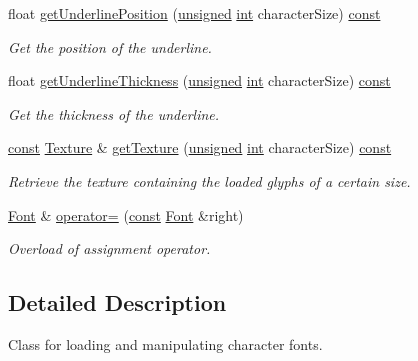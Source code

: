 \begin{DoxyCompactItemize}
float \hyperlink{classsf_1_1_font_a9b21290b1b8bbf75232f64bdd7a994da}{get\-Underline\-Position} (\hyperlink{curses_8priv_8h_aca40206900cfc164654362fa8d4ad1e6}{unsigned} \hyperlink{term__entry_8h_ad65b480f8c8270356b45a9890f6499ae}{int} character\-Size) \hyperlink{term__entry_8h_a57bd63ce7f9a353488880e3de6692d5a}{const} 
\begin{DoxyCompactList}\small\item\em Get the position of the underline. \end{DoxyCompactList}\item 
float \hyperlink{classsf_1_1_font_a17fd6090e585a76f1f7b7f658ea70ee1}{get\-Underline\-Thickness} (\hyperlink{curses_8priv_8h_aca40206900cfc164654362fa8d4ad1e6}{unsigned} \hyperlink{term__entry_8h_ad65b480f8c8270356b45a9890f6499ae}{int} character\-Size) \hyperlink{term__entry_8h_a57bd63ce7f9a353488880e3de6692d5a}{const} 
\begin{DoxyCompactList}\small\item\em Get the thickness of the underline. \end{DoxyCompactList}\item 
\hyperlink{term__entry_8h_a57bd63ce7f9a353488880e3de6692d5a}{const} \hyperlink{classsf_1_1_texture}{Texture} \& \hyperlink{classsf_1_1_font_a887368a4e6a3dfa32dea89d2af315951}{get\-Texture} (\hyperlink{curses_8priv_8h_aca40206900cfc164654362fa8d4ad1e6}{unsigned} \hyperlink{term__entry_8h_ad65b480f8c8270356b45a9890f6499ae}{int} character\-Size) \hyperlink{term__entry_8h_a57bd63ce7f9a353488880e3de6692d5a}{const} 
\begin{DoxyCompactList}\small\item\em Retrieve the texture containing the loaded glyphs of a certain size. \end{DoxyCompactList}\item 
\hyperlink{classsf_1_1_font}{Font} \& \hyperlink{classsf_1_1_font_a232515549846e3172a514d0b47918399}{operator=} (\hyperlink{term__entry_8h_a57bd63ce7f9a353488880e3de6692d5a}{const} \hyperlink{classsf_1_1_font}{Font} \&right)
\begin{DoxyCompactList}\small\item\em Overload of assignment operator. \end{DoxyCompactList}\end{DoxyCompactItemize}


\subsection{Detailed Description}
Class for loading and manipulating character fonts. 

